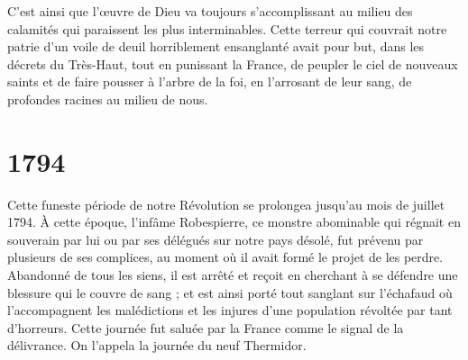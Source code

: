 C'est ainsi que l'œuvre de Dieu va toujours s'accomplissant au milieu des calamités qui paraissent les plus interminables. Cette terreur qui couvrait notre patrie d'un voile de deuil horriblement ensanglanté avait pour but, dans les décrets du Très-Haut, tout en punissant la France, de peupler le ciel de nouveaux saints et de faire pousser à l'arbre de la foi, en l'arrosant de leur sang, de profondes racines au milieu de nous.

\section*{1794}
Cette funeste période de notre Révolution se prolongea jusqu'au mois de juillet 1794. À cette époque, l'infâme Robespierre, ce monstre abominable qui régnait en souverain par lui ou par ses délégués sur notre pays désolé, fut prévenu par plusieurs de ses complices, au moment où il avait formé le projet de les perdre. Abandonné de tous les siens, il est arrêté et reçoit en cherchant à se défendre une blessure qui le couvre de sang ; et est ainsi porté tout sanglant sur l'échafaud où l'accompagnent les malédictions et les injures d'une population révoltée par tant d'horreurs. Cette journée fut saluée par la France comme le signal de la délivrance. On l'appela la journée du neuf Thermidor.

